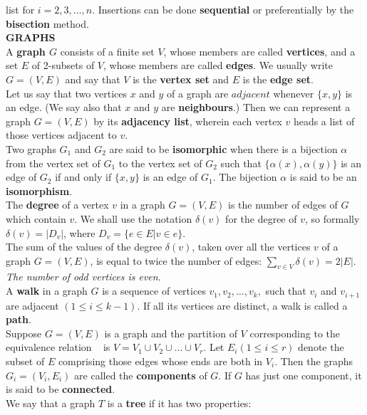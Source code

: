 \documentclass[10pt,landscape]{article}
\begin{document}
\begin{multicols}{4}
list for $i = 2,3,\dots ,n$. Insertions can be done
\textbf{sequential} or preferentially by the \textbf{bisection}
method.\\
\textbf{GRAPHS}\\
A \textbf{graph $G$} consists of a finite set $V$, whose members are
called \textbf{vertices}, and a set $E$ of 2-subsets of $V$, whose
members are called \textbf{edges}. We usually write $G = (V,E)$ and
say that $V$ is the \textbf{vertex set} and $E$ is the \textbf{edge
  set}.\\
Let us say that two vertices $x$ and $y$ of a graph are $adjacent$
whenever $\{x,y\}$ is an edge. (We say also that $x$ and $y$ are
\textbf{neighbours}.) Then we can represent a graph $G = (V,E)$ by its
\textbf{adjacency list}, wherein each vertex $v$ heads a list of those
vertices adjacent to $v$.\\
Two graphs $G_{1}$ and $G_{2}$ are said to be \textbf{isomorphic} when
there is a bijection $\alpha$ from the vertex set of $G_{1}$ to the
vertex set of $G_{2}$ such that $\{\alpha(x), \alpha(y)\}$ is an edge
of $G_{2}$ if and only if $\{x, y\}$ is an edge of $G_{1}$. The
bijection $\alpha$ is said to be an \textbf{isomorphism}.\\
The \textbf{degree} of a vertex $v$ in a graph $G = (V,E)$ is the
number of edges of $G$ which contain $v$. We shall use the notation
$\delta(v)$ for the degree of $v$, so formally $\delta(v) = |D_{v}|$,
where $D_{v} = \{e \in E | v \in e \}$.\\
The sum of the values of the degree $\delta(v)$, taken over all the
vertices $v$ of a graph $G = (V,E)$, is equal to twice the number of
edges: $\displaystyle\sum_{v \in V} \delta(v) = 2|E|$.\\
\textit{The number of odd vertices is even}.\\
A \textbf{walk} in a graph $G$ is a sequence of vertices
$v_{1},v_{2},\dots , v_{k},$ such that $v_{i}$ and $v_{i+1}$ are
adjacent $(1 \leq i \leq k-1)$. If all its vertices are distinct, a
walk is called a \textbf{path}.\\
Suppose $G = (V,E)$ is a graph and the partition of $V$ corresponding
to the equivalence relation ~ is $V = V_{1} \cup V_{2} \cup \dots \cup
V_{r}$. Let $E_{i} (1 \leq i \leq r)$ denote the subset of $E$
comprising those edges whose ends are both in $V_{i}$. Then the graphs
$G_{i} = (V_{i}, E_{i})$ are called the \textbf{components} of $G$. If
$G$ has just one component, it is said to be \textbf{connected}.\\
We say that a graph $T$ is a \textbf{tree} if it has two properties:

\end{multicols}
\end{document}

